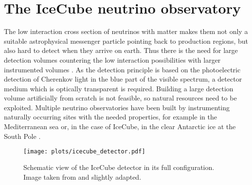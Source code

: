 \chapter{The IceCube neutrino observatory}
  \label{chap:icecube}

The low interaction cross section of neutrinos with matter makes them not only a suitable astrophysical messenger particle pointing back to production regions, but also hard to detect when they arrive on earth.
Thus there is the need for large detection volumes countering the low interaction possibilities with larger instrumented volumes \cite{Katz:2011ke}.
As the detection principle is based on the photoelectric detection of Cherenkov light in the blue part of the visible spectrum, a detector medium which is optically transparent is required.
Building a large detection volume artificially from scratch is not feasible, so natural resources need to be exploited.
Multiple neutrino observatories have been built by instrumenting naturally occurring sites with the needed properties, for example in the Mediterranean sea or, in the case of IceCube, in the clear Antarctic ice at the South Pole \cite{Katz:2011ke}.

\begin{figure}[htbp]
  \centering
  \texttt{[image: plots/icecube\_detector.pdf]}
  \caption[Schematic view of the IceCube detector]{
    Schematic view of the IceCube detector in its full configuration.
    Image taken from \cite{ICOnlineGalleryDetector} and slightly adapted.
  }
  \label{fig:icecube_detector}
\end{figure}


